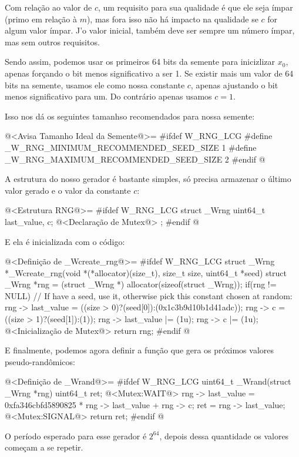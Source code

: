 Com relação ao valor de $c$, um requisito para sua qualidade é que ele
seja ímpar (primo em relação à $m$), mas fora isso não há impacto na
qualidade se $c$ for algum valor ímpar. J'o valor inicial, também deve
ser sempre um número ímpar, mas sem outros requisitos.

Sendo assim, podemos usar os primeiros 64 bits da semente para
inicizlizar $x_0$, apenas forçando o bit menos significativo a ser
1. Se existir mais um valor de 64 bits na semente, usamos ele como
nossa constante $c$, apenas ajustando o bit menos significativo para
um. Do contrário apenas usamos $c=1$.

Isso nos dá os seguintes tamanhso recomendados para nossa semente:

\iniciocodigo
@<Avisa Tamanho Ideal da Semente@>=
#ifdef W_RNG_LCG
#define _W_RNG_MINIMUM_RECOMMENDED_SEED_SIZE  1
#define _W_RNG_MAXIMUM_RECOMMENDED_SEED_SIZE  2
#endif
@
\fimcodigo

A estrutura do nosso gerador é bastante simples, só precisa armazenar
o último valor gerado e o valor da constante $c$:

\iniciocodigo
@<Estrutura RNG@>=
#ifdef W_RNG_LCG
struct _Wrng{
  uint64_t last_value, c;
  @<Declaração de Mutex@>
};
#endif
@
\fimcodigo

E ela é inicializada com o código:

\iniciocodigo
@<Definição de \_Wcreate\_rng@>=
#ifdef W_RNG_LCG
struct _Wrng *_Wcreate_rng(void *(*allocator)(size_t), size_t size,
                           uint64_t *seed){
  struct _Wrng *rng = (struct _Wrng *) allocator(sizeof(struct _Wrng));
  if(rng != NULL){
    // If have a seed, use it, otherwise pick this constant chosen at random:
    rng -> last_value = ((size > 0)?(seed[0]):(0x1c3b9d10b1d41adc));
    rng -> c = ((size > 1)?(seed[1]):(1));
    rng -> last_value |= (1u);
    rng -> c |= (1u);
    @<Inicialização de Mutex@>
  }
  return rng;
}
#endif
@
\fimcodigo

E finalmente, podemos agora definir a função que gera os próximos
valores pseudo-randômicos:

\iniciocodigo
@<Definição de \_Wrand@>=
#ifdef W_RNG_LCG
uint64_t _Wrand(struct _Wrng *rng){
  uint64_t ret;
  @<Mutex:WAIT@>
  rng -> last_value = 0xfa346cbfd5890825 * rng -> last_value + rng -> c;
  ret = rng -> last_value;
  @<Mutex:SIGNAL@>
  return ret;
}
#endif
@
\fimcodigo

O período esperado para esse gerador é $2^{64}$, depois dessa
quantidade os valores começam a se repetir.


